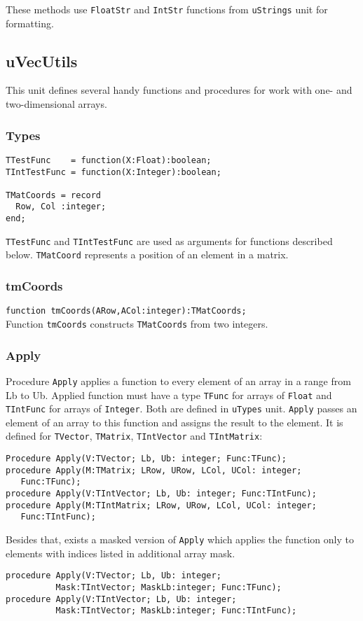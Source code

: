 \documentclass[12pt,a4paper,oneside]{article}
\newcommand{\code}[1]{\texttt{#1}}
\begin{document}
These methods use \code{FloatStr} and \code{IntStr} functions from \code{uStrings} unit for formatting. 

\subsection{uVecUtils}
This unit defines several handy functions and procedures for work with one- and two-dimensional arrays.
\subsubsection{Types}
\begin{verbatim}
TTestFunc    = function(X:Float):boolean;
TIntTestFunc = function(X:Integer):boolean;

TMatCoords = record
  Row, Col :integer;
end;
\end{verbatim}
\code{TTestFunc} and \code{TIntTestFunc} are used as arguments for functions described below. \code{TMatCoord} represents a position of an element in a matrix.
\subsubsection{tmCoords}
\code{function tmCoords(ARow,ACol:integer):TMatCoords;}\\
Function \code{tmCoords} constructs \code{TMatCoords} from two integers.
\subsubsection{Apply}
Procedure \code{Apply} applies a function to every element of an array in a range from Lb to Ub. Applied function must have a type \code{TFunc} for arrays of \code{Float} and \code{TIntFunc} for arrays of \code{Integer}. Both are defined in \code{uTypes} unit. \code{Apply} passes an element of an array to this function and assigns the result to the element. It is defined for \code{TVector}, \code{TMatrix}, \code{TIntVector} and \code{TIntMatrix}:
\begin{verbatim}
Procedure Apply(V:TVector; Lb, Ub: integer; Func:TFunc);
procedure Apply(M:TMatrix; LRow, URow, LCol, UCol: integer; 
   Func:TFunc);
procedure Apply(V:TIntVector; Lb, Ub: integer; Func:TIntFunc);
procedure Apply(M:TIntMatrix; LRow, URow, LCol, UCol: integer;
   Func:TIntFunc); 
\end{verbatim}
Besides that, exists a masked version of \code{Apply} which applies the function only to elements with indices listed in additional array mask.
\begin{verbatim}
procedure Apply(V:TVector; Lb, Ub: integer; 
          Mask:TIntVector; MaskLb:integer; Func:TFunc);
procedure Apply(V:TIntVector; Lb, Ub: integer;
          Mask:TIntVector; MaskLb:integer; Func:TIntFunc); 
\end{verbatim} 
\end{document}

